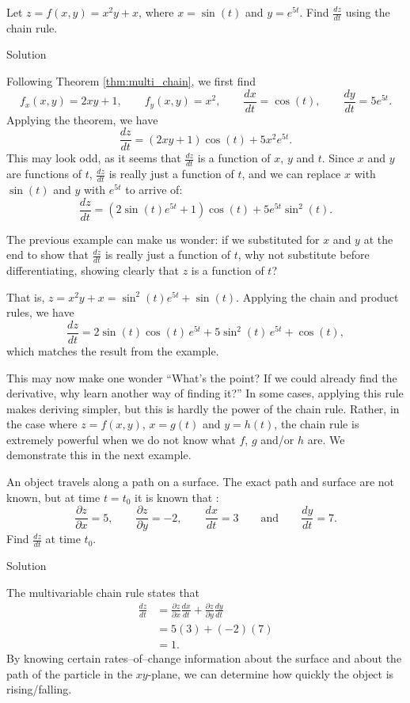 \begin{example}\label{ex_mchain1}
Let $z=f(x,y)=x^2y+x$, where $x=\sin(t)$ and $y=e^{5t}$. Find $ \frac{dz}{dt}$ using the chain rule.

Solution 

Following Theorem \ref{thm:multi_chain}, we first find
$$f_x(x,y) = 2xy+1,\qquad f_y(x,y) = x^2,\qquad \frac{dx}{dt} = \cos(t),\qquad \frac{dy}{dt}= 5e^{5t}.$$
Applying the theorem, we have
$$\frac{dz}{dt} = (2xy+1)\cos(t) + 5x^2e^{5t}.$$
This may look odd, as it seems that $\frac{dz}{dt}$ is a function of $x$, $y$ and $t$. Since $x$ and $y$ are functions of $t$, $\frac{dz}{dt}$ is really just a function of $t$, and we can replace $x$ with $\sin(t)$ and $y$ with $e^{5t}$ to arrive of:
$$\frac{dz}{dt} = (2\sin (t)e^{5t}+1)\cos(t) + 5e^{5t}\sin^2(t).$$
\end{example}

The previous example can make us wonder: if we substituted for $x$ and $y$ at the end to show that $\frac{dz}{dt}$ is really just a function of $t$, why not substitute before differentiating, showing clearly that $z$ is a function of $t$?

That is, $z = x^2y+x = \sin^2(t)e^{5t}+\sin(t).$ Applying the chain and product rules, we have 
$$\frac{dz}{dt} = 2\sin(t)\cos(t)\, e^{5t}+ 5\sin^2(t)\,e^{5t}+\cos(t),$$ which matches the result from the example.

This may now make one wonder ``What's the point? If we could already find the derivative, why learn another way of finding it?'' In some cases, applying this rule makes deriving simpler, but this is hardly the power of the chain rule. Rather, in the case where $z=f(x,y)$, $x=g(t)$ and $y=h(t)$, the chain rule is extremely powerful when we do not know what $f$, $g$ and/or $h$ are. We demonstrate this in the next example.

\begin{example}\label{ex_mchain100}
An object travels along a path on a surface. The exact path and surface are not known, but at time $t=t_0$ it is known that :
$$\frac{\partial z}{\partial x} = 5,\qquad \frac{\partial z}{\partial y}=-2,\qquad \frac{dx}{dt}=3\qquad \text{and}\qquad \frac{dy}{dt}=7.$$
Find $\frac{dz}{dt}$ at time $t_0$.

Solution 

The multivariable chain rule states that 
\begin{align*}
\frac{dz}{dt} &= \frac{\partial z}{\partial x}\frac{dx}{dt} + \frac{\partial z}{\partial y}\frac{dy}{dt} \\
				&= 5(3)+(-2)(7) \\
				&=1.
\end{align*}
By knowing certain rates--of--change information about the surface and about the path of the particle in the $xy$-plane, we can determine how quickly the object is rising/falling. 
\end{example}

